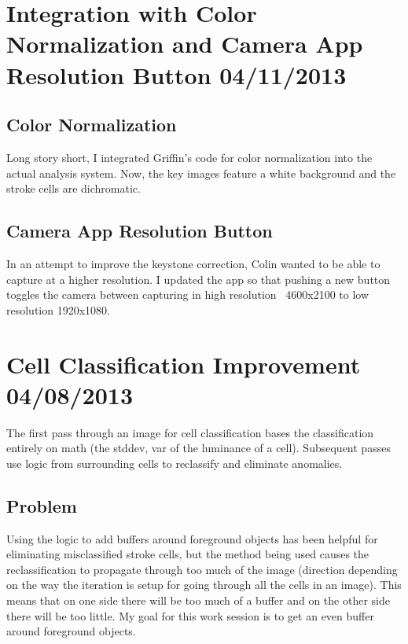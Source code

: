 \documentclass[]{article}
\begin{document}
	\tableofcontents
	\newpage
	\setcounter{page}{1}
	\thispagestyle{empty}
	
	
	\setlength{\parindent}{0pt}
	\setlength{\parskip}{6pt}
	
	\section{Integration with Color Normalization and Camera App Resolution Button 04/11/2013}
		
		\subsection{Color Normalization}
			Long story short, I integrated Griffin's code for color normalization into the actual analysis system. Now, the key images feature a white background and the stroke cells are dichromatic. 
			
		\subsection{Camera App Resolution Button}
			In an attempt to improve the keystone correction, Colin wanted to be able to capture at a higher resolution. I updated the app so that pushing a new button toggles the camera between capturing in high resolution ~4600x2100 to low resolution 1920x1080.
	
	\section{Cell Classification Improvement 04/08/2013}
		The first pass through an image for cell classification bases the classification entirely on math (the stddev, var of the luminance of a cell). Subsequent passes use logic from surrounding cells to reclassify and eliminate anomalies.
		
		\subsection{Problem}
			Using the logic to add buffers around foreground objects has been helpful for eliminating misclassified stroke cells, but the method being used causes the reclassification to propagate through too much of the image (direction depending on the way the iteration is setup for going through all the cells in an image). This means that on one side there will be too much of a buffer and on the other side there will be too little. My goal for this work session is to get an even buffer around foreground objects.
			
\end{document}
